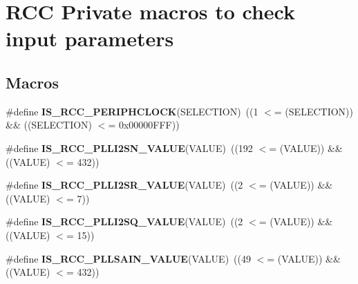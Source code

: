 \hypertarget{group___r_c_c_ex___i_s___r_c_c___definitions}{}\section{R\+CC Private macros to check input parameters}
\label{group___r_c_c_ex___i_s___r_c_c___definitions}
\subsection*{Macros}
\begin{DoxyCompactItemize}
\item 
\#define {\bfseries I\+S\+\_\+\+R\+C\+C\+\_\+\+P\+E\+R\+I\+P\+H\+C\+L\+O\+CK}(S\+E\+L\+E\+C\+T\+I\+ON)~((1 $<$= (S\+E\+L\+E\+C\+T\+I\+ON)) \&\& ((S\+E\+L\+E\+C\+T\+I\+ON) $<$= 0x00000\+F\+F\+F))\hypertarget{group___r_c_c_ex___i_s___r_c_c___definitions_gaae1eea378ffa99c1a4186f0065c257a8}{}\label{group___r_c_c_ex___i_s___r_c_c___definitions_gaae1eea378ffa99c1a4186f0065c257a8}

\item 
\#define {\bfseries I\+S\+\_\+\+R\+C\+C\+\_\+\+P\+L\+L\+I2\+S\+N\+\_\+\+V\+A\+L\+UE}(V\+A\+L\+UE)~((192 $<$= (V\+A\+L\+UE)) \&\& ((V\+A\+L\+UE) $<$= 432))\hypertarget{group___r_c_c_ex___i_s___r_c_c___definitions_gac30fb7f6fe9f22a7d6c5585909db5c3c}{}\label{group___r_c_c_ex___i_s___r_c_c___definitions_gac30fb7f6fe9f22a7d6c5585909db5c3c}

\item 
\#define {\bfseries I\+S\+\_\+\+R\+C\+C\+\_\+\+P\+L\+L\+I2\+S\+R\+\_\+\+V\+A\+L\+UE}(V\+A\+L\+UE)~((2 $<$= (V\+A\+L\+UE)) \&\& ((V\+A\+L\+UE) $<$= 7))\hypertarget{group___r_c_c_ex___i_s___r_c_c___definitions_gaa2fece4b24f6219b423e1b092b7705c8}{}\label{group___r_c_c_ex___i_s___r_c_c___definitions_gaa2fece4b24f6219b423e1b092b7705c8}

\item 
\#define {\bfseries I\+S\+\_\+\+R\+C\+C\+\_\+\+P\+L\+L\+I2\+S\+Q\+\_\+\+V\+A\+L\+UE}(V\+A\+L\+UE)~((2 $<$= (V\+A\+L\+UE)) \&\& ((V\+A\+L\+UE) $<$= 15))\hypertarget{group___r_c_c_ex___i_s___r_c_c___definitions_gafedb34faed940069eb7485776e5875c5}{}\label{group___r_c_c_ex___i_s___r_c_c___definitions_gafedb34faed940069eb7485776e5875c5}

\item 
\#define {\bfseries I\+S\+\_\+\+R\+C\+C\+\_\+\+P\+L\+L\+S\+A\+I\+N\+\_\+\+V\+A\+L\+UE}(V\+A\+L\+UE)~((49 $<$= (V\+A\+L\+UE)) \&\& ((V\+A\+L\+UE) $<$= 432))\hypertarget{group___r_c_c_ex___i_s___r_c_c___definitions_ga400e5231409376eba690f252db7b2a19}{}\label{group___r_c_c_ex___i_s___r_c_c___definitions_ga400e5231409376eba690f252db7b2a19}


\end{DoxyCompactItemize}
